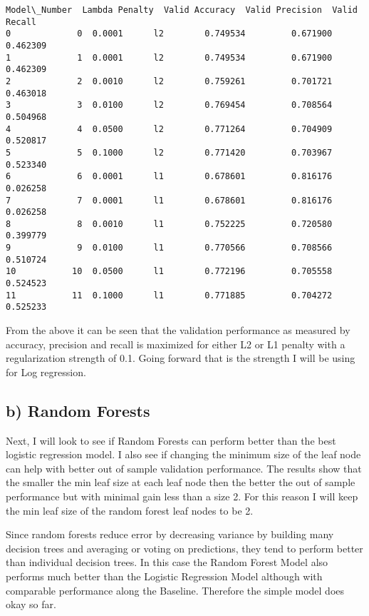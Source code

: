 \documentclass[11pt]{article}
\begin{document}
    \begin{Verbatim}[commandchars=\\\{\}]
   Model\_Number  Lambda Penalty  Valid Accuracy  Valid Precision  Valid Recall
0             0  0.0001      l2        0.749534         0.671900      0.462309
1             1  0.0001      l2        0.749534         0.671900      0.462309
2             2  0.0010      l2        0.759261         0.701721      0.463018
3             3  0.0100      l2        0.769454         0.708564      0.504968
4             4  0.0500      l2        0.771264         0.704909      0.520817
5             5  0.1000      l2        0.771420         0.703967      0.523340
6             6  0.0001      l1        0.678601         0.816176      0.026258
7             7  0.0001      l1        0.678601         0.816176      0.026258
8             8  0.0010      l1        0.752225         0.720580      0.399779
9             9  0.0100      l1        0.770566         0.708566      0.510724
10           10  0.0500      l1        0.772196         0.705558      0.524523
11           11  0.1000      l1        0.771885         0.704272      0.525233

    \end{Verbatim}

    From the above it can be seen that the validation performance as
measured by accuracy, precision and recall is maximized for either L2 or
L1 penalty with a regularization strength of 0.1. Going forward that is
the strength I will be using for Log regression.

    \subsection{b) Random Forests}\label{b-random-forests}

Next, I will look to see if Random Forests can perform better than the
best logistic regression model. I also see if changing the minimum size
of the leaf node can help with better out of sample validation
performance. The results show that the smaller the min leaf size at each
leaf node then the better the out of sample performance but with minimal
gain less than a size 2. For this reason I will keep the min leaf size
of the random forest leaf nodes to be 2.

Since random forests reduce error by decreasing variance by building
many decision trees and averaging or voting on predictions, they tend to
perform better than individual decision trees. In this case the Random
Forest Model also performs much better than the Logistic Regression
Model although with comparable performance along the Baseline. Therefore
the simple model does okay so far.
\end{document}

